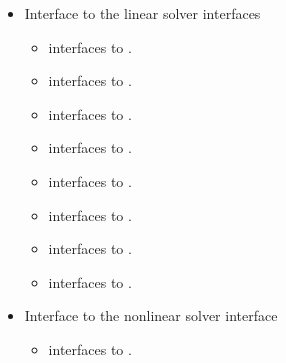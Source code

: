 \begin{itemize}
\begin{itemize}
  \end{itemize}  
\item Interface to the linear solver interfaces
  \begin{itemize}
  \item {}    
    interfaces to .
  \item {}
    interfaces to .
  \item {}
    interfaces to .
  \item {}
    interfaces to .
  \item {}
    interfaces to .
  \item {}
    interfaces to .
  \item {}
    interfaces to .
  \item {}    
    interfaces to .
 \end{itemize}
\item Interface to the nonlinear solver interface
  \begin{itemize}
  \item {}
    interfaces to .
 \end{itemize}

\end{itemize}

